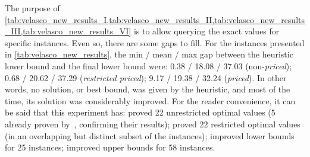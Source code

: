 \documentclass[ppgc,tese,english,formais,babel]{iiufrgs}
\begin{document}
The purpose of \cref{tab:velasco_new_results_I,tab:velasco_new_results_II,tab:velasco_new_results_III,tab:velasco_new_results_VI} is to allow querying the exact values for specific instances.
Even so, there are some gaps to fill.
For the instances presented in \cref{tab:velasco_new_results},
the min / mean / max gap between the heuristic lower bound and the final lower bound were: 0.38 / 18.08 / 37.03 (non-\emph{priced}); 0.68 / 20.62 / 37.29 (\emph{restricted priced}); 9.17 / 19.38 / 32.24 (\emph{priced}).
In other words, no solution, or best bound, was given by the heuristic, and most of the time, its solution was considerably improved.
For the reader convenience, it can be said that this experiment has:
proved 22 unrestricted optimal values (5 already proven by~\citet{velasco:2019}, confirming their results);
proved 22 restricted optimal values (in an overlapping but distinct subset of the instances);
improved lower bounds for 25 instances;
improved upper bounds for 58 instances.
\end{document}
